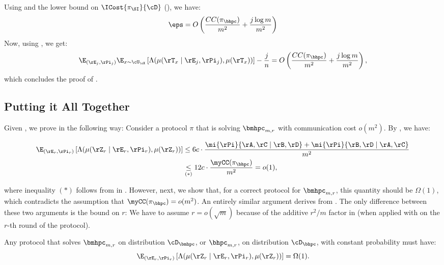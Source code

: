 \noindent
Using  and the lower bound on $\ICost{\pi_\SI}{\cD}$ (), we have:
\[
\eps = O\left(\frac{CC(\pi_\bhpc)}{m^2} + \frac{j \log m} {m^2}\right)
\]
Now, using , we get:
\[
\E_{(\rE_j, \rPi_j)}\E_{x \sim \cU_\cX} \left[\Lambda(\mu(\rT_x \mid \rE_j,
\rPi_j), \mu(\rT_x)) \right] - \frac j n = O\left(\frac{CC(\pi_\bhpc)}{m^2} + \frac{j \log m} {m^2}\right),
\]
which concludes the proof of .


\subsection{Putting it All Together}\label{sec:put-together}


 Given , we prove  in the following way:
 Consider a protocol $\pi$ that is solving $\bmhpc_{m,r}$ with communication
 cost $o(m^2)$.
 By , we have:

 \begin{align*}
     \E_{(\rE_r, \rPi_r)}\left[\Lambda(\mu(\rZ_r \mid \rE_r, \rPi_r), \mu(\rZ_r))\right]
     &\leq 6 c \cdot \frac{\mi{\rPi}{\rA,\rC \mid \rB,\rD} + \mi{\rPi}{\rB,\rD
\mid \rA,\rC}}{m^2}\\ &\underset{(\ast)}{\leq} 12c \cdot \frac{\myCC(\pi_\bhpc)}{m^2} = o(1),
 \end{align*}

where inequality $(\ast)$ follows from 
in .
However, next, we show that, for a correct protocol for $\bmhpc_{m,r}$, this
quantity should be $\Omega(1)$, which contradicts the assumption that
$\myCC(\pi_\bhpc) = o(m^2)$.
An entirely similar argument derives  from .
The only difference between these two arguments is the bound on $r$: We have to
assume $r = o(\sqrt{m})$ because of the additive $r^2/m$ factor in
 (when applied with on the $r$-th round of the protocol).




\begin{lemma} \label{lem:hpc-correctness}
    Any protocol that solves $\bmhpc_{m,r}$ on distribution $\cD_\bmhpc$, or $\bhpc_{m,r}$, on distribution $\cD_\bhpc$, with constant probability must have:
    \[
 \E_{(\rE_r, \rPi_r)}\left[\Lambda(\mu(\rZ_r \mid \rE_r, \rPi_r), \mu(\rZ_r))\right] = \Omega(1).
\]
\end{lemma}

